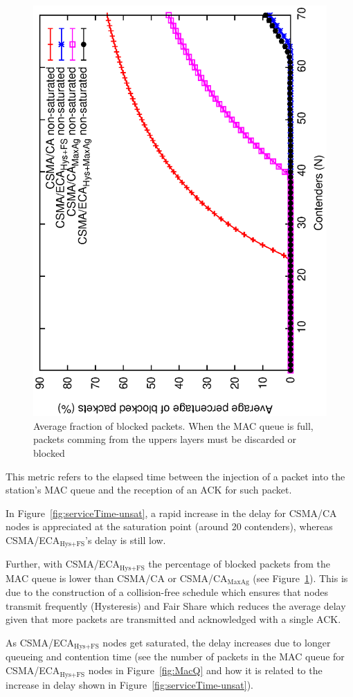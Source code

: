 \documentclass[a4paper,journal]{IEEEtran}
\begin{document}
	\begin{figure}[tb]
		\centering
		\includegraphics[width=0.7\linewidth,angle=-90]{figures/unsaturated/blockingProb-unsat/blocking-unsaturated.eps}
		\caption{Average fraction of blocked packets. When the MAC queue is full, packets comming from the uppers layers must be discarded or blocked}
		\label{fig:blocked-packets}
	\end{figure}	
	
	This metric refers to the elapsed time between the injection of a packet into the station's MAC queue and the reception of an ACK for such packet. 
	
	In Figure~\ref{fig:serviceTime-unsat}, a rapid increase in the delay for CSMA/CA nodes is appreciated at the saturation point (around 20 contenders), whereas CSMA/ECA$_{\text{Hys+FS}}$'s delay is still low. 
	
	Further, with CSMA/ECA$_{\text{Hys+FS}}$ the percentage of blocked packets from the MAC queue is lower than CSMA/CA or CSMA/CA$_{\text{MaxAg}}$ (see Figure~\ref{fig:blocked-packets}). This is due to the construction of a collision-free schedule which ensures that nodes transmit frequently (Hysteresis) and Fair Share which reduces the average delay given that more packets are transmitted and acknowledged with a single ACK.
	
	As CSMA/ECA$_{\text{Hys+FS}}$ nodes get saturated, the delay increases due to longer queueing and contention time (see the number of packets in the MAC queue for CSMA/ECA$_{\text{Hys+FS}}$ nodes in Figure~\ref{fig:MacQ} and how it is related to the increase in delay shown in Figure~\ref{fig:serviceTime-unsat}).
	
\end{document}
